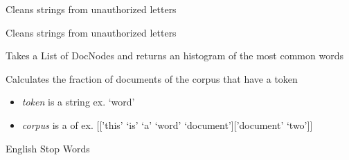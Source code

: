 \documentclass[letterpaper,10pt,english]{sphinxmanual}
\begin{document}
\begin{fulllineitems}
\label{theseus:theseus.cleanString}
Cleans strings from unauthorized letters

\end{fulllineitems}


\begin{fulllineitems}
\label{theseus:theseus.cleanStringNoDel}
Cleans strings from unauthorized letters

\end{fulllineitems}


\begin{fulllineitems}
\label{theseus:theseus.clusterHist}
Takes a List of DocNodes and returns an histogram of the most common words

\end{fulllineitems}


\begin{fulllineitems}
\label{theseus:theseus.dtf}
Calculates the fraction of documents of the corpus that have a token
\begin{itemize}
\item {} 
\emph{token} is a string               ex. `word'

\item {} 
\emph{corpus} is a  of     ex. {[}{[}'this' `is' `a' `word' `document'{]}{[}'document' `two'{]}{]}

\end{itemize}

\end{fulllineitems}


\begin{fulllineitems}
\label{theseus:theseus.enClean}
English Stop Words

\end{fulllineitems}
\end{document}
